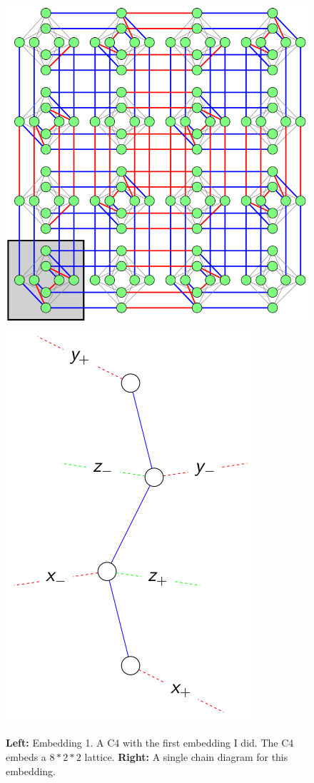 \documentclass[11pt]{report}
\newcommand{\?}{\stackrel{?}{=}}
\begin{document}
\begin{figure}[h!]
  \centerline{\includegraphics[width=\linewidth/3]{resources/images/emb1.png}\hspace{1cm}\includegraphics[height=\linewidth/3]{resources/images/emb1_chain.png}}
  \caption{\textbf{Left:} Embedding 1. A C4 with the first embedding I did. The C4 embeds a $8*2*2$ lattice. \textbf{Right:} A single chain diagram for this embedding.}
  \label{fig:boat1}
\end{figure}
\end{document}
